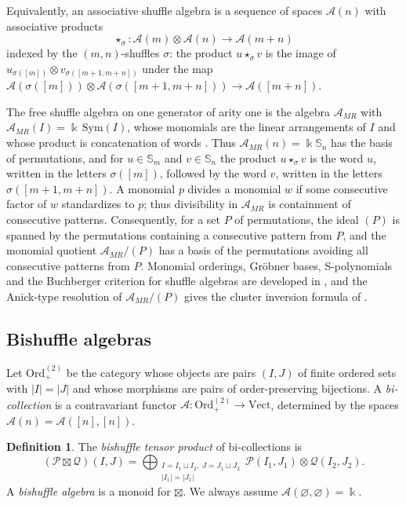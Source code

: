 \documentclass[11pt]{amsart}
\theoremstyle{definition}
\newtheorem{definition}[theorem]{Definition}
\theoremstyle{remark}
\newcommand{\bS}{\mathbb{S}}
\newcommand{\kk}{\Bbbk}
\newcommand{\Ord}{\mathrm{Ord}_+}
\newcommand{\Vect}{\mathrm{Vect}}
\newcommand{\Sym}{\mathrm{Sym}}
\newcommand{\cA}{\mathscr{A}}
\newcommand{\AMR}{\cA_{MR}}
\begin{document}
Equivalently, an associative shuffle algebra is a sequence of spaces $\cA(n)$ with associative products
\[
\star_\sigma\colon\cA(m)\otimes\cA(n)\to\cA(m+n)
\]
indexed by the $(m,n)$-shuffles $\sigma$: the product $u\star_\sigma v$ is the image of $u_{\sigma([m])}\otimes v_{\sigma([m+1,m+n])}$ under the map $\cA(\sigma([m]))\otimes\cA(\sigma([m+1,m+n]))\to\cA([m+n])$.

The free shuffle algebra on one generator of arity one is the algebra $\AMR$ with $\AMR(I)=\kk\,\Sym(I)$, whose monomials are the linear arrangements of $I$ and whose product is concatenation of words \cite{Ronco,DK}. Thus $\AMR(n)=\kk\bS_n$ has the basis of permutations, and for $u\in\bS_m$ and $v\in\bS_n$ the product $u\star_\sigma v$ is the word $u$, written in the letters $\sigma([m])$, followed by the word $v$, written in the letters $\sigma([m+1,m+n])$. A monomial $p$ divides a monomial $w$ if some consecutive factor of $w$ standardizes to $p$; thus divisibility in $\AMR$ is containment of consecutive patterns. Consequently, for a set $P$ of permutations, the ideal $(P)$ is spanned by the permutations containing a consecutive pattern from $P$, and the monomial quotient $\AMR/(P)$ has a basis of the permutations avoiding all consecutive patterns from $P$. Monomial orderings, Gr\"obner bases, S-polynomials and the Buchberger criterion for shuffle algebras are developed in \cite{DK}, and the Anick-type resolution of $\AMR/(P)$ gives the cluster inversion formula of \cite[\S4]{DK}.

\subsection{Bishuffle algebras}\label{sec:bishuffle}

Let $\Ord^{(2)}$ be the category whose objects are pairs $(I,J)$ of finite ordered sets with $|I|=|J|$ and whose morphisms are pairs of order-preserving bijections. A \emph{bi-collection} is a contravariant functor $\cA\colon\Ord^{(2)}\to\Vect$, determined by the spaces $\cA(n)=\cA([n],[n])$.

\begin{definition}
\label{def::bishuffle}
The \emph{bishuffle tensor product} of bi-collections is
\[
(\mathscr P\boxtimes\mathscr Q)(I,J)=\bigoplus_{\substack{I=I_1\sqcup I_2,\ J=J_1\sqcup J_2\\ |I_1|=|J_1|}}\mathscr P(I_1,J_1)\otimes\mathscr Q(I_2,J_2).
\]
A \emph{bishuffle algebra} is a monoid for $\boxtimes$. We always assume $\cA(\varnothing,\varnothing)=\kk$.
\end{definition}
\end{document}
